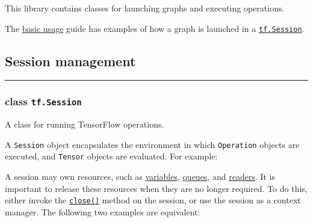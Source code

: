 This library contains classes for launching graphs and executing
operations.

The \href{../../get_started/introduction.md\#basic-usage}{basic usage}
guide has examples of how a graph is launched in a
\protect\hyperlink{Session}{\texttt{tf.Session}}.

\subsection{Session management }\label{session-management}

\begin{center}\rule{0.5\linewidth}{\linethickness}\end{center}

\subsubsection{class \lstinline{tf.Session}} \label{class-tf.session}

A class for running TensorFlow operations.

A \texttt{Session} object encapsulates the environment in which
\texttt{Operation} objects are executed, and \texttt{Tensor} objects are
evaluated. For example:

\begin{Shaded}
\begin{Highlighting}[]
\OperatorTok{=} \NormalTok{)}
\OperatorTok{=} \NormalTok{)}
\OperatorTok{=} \OperatorTok{*} 

\OperatorTok{=} 

 
\end{Highlighting}
\end{Shaded}

A session may own resources, such as
\href{../../api_docs/python/state_ops.md\#Variable}{variables},
\href{../../api_docs/python/io_ops.md\#QueueBase}{queues}, and
\href{../../api_docs/python/io_ops.md\#ReaderBase}{readers}. It is
important to release these resources when they are no longer required.
To do this, either invoke the
\protect\hyperlink{Session.close}{\texttt{close()}} method on the
session, or use the session as a context manager. The following two
examples are equivalent:

